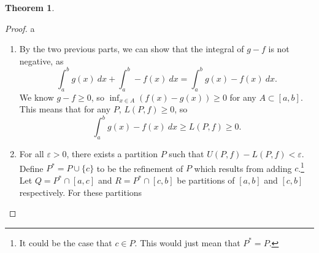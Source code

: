 \documentclass{article}
\def\upint{\mathchoice%
	{\mkern13mu\overline{\vphantom{\intop}\mkern7mu}\mkern-20mu}%
	{\mkern7mu\overline{\vphantom{\intop}\mkern7mu}\mkern-14mu}%
	{\mkern7mu\overline{\vphantom{\intop}\mkern7mu}\mkern-14mu}%
	{\mkern7mu\overline{\vphantom{\intop}\mkern7mu}\mkern-14mu}%
	\int}
\def\lowint{\mkern3mu\underline{\vphantom{\intop}\mkern7mu}\mkern-10mu\int}
\theoremstyle{definition}
\newtheorem{theorem}{Theorem}[section]
\begin{document}
\begin{theorem}
\begin{proof}{\color{white}a}
\begin{enumerate}
\begin{align*}
				\end{align*}
				This gives
				\begin{align*}
					\upint_a^bf(x)\ dx= \inf\limits_{P\in\textbf{P}([a,b])}U(P,cf)=c\inf\limits_{P\in\textbf{P}([a,b])}U(P,f)=c\upint_a^bf(x)\ dx,\\\lowint_a^bf(x)\ dx= \sup\limits_{P\in\textbf{P}([a,b])}L(P,cf)=c\inf\limits_{P\in\textbf{P}([a,b])}L(P,f)=c\lowint_a^bf(x)\ dx.
				\end{align*}
				Since $ f $ is Riemann integrable, its upper and lower Riemann integrals are equal. This establishes the integrability of $ f $, as $$ c\lowint_a^bf(x)\ dx=c\upint_a^bf(x)\ dx=c\int_a^bf(x)\ dx.$$
				
				Now let $ c=-1 $. In this case, we can't ``factor'' out a constant from a supremum and infimum. Instead, for any $ A\subset[a,b] $, we have
				\begin{align*}
					\sup\limits_{x\in A} -f(x)=-\inf\limits_{x\in A} f(x),\\\inf\limits_{x\in A} -f(x)=-\sup\limits_{x\in A} f(x).
				\end{align*}
				We will have $ U(P,-f)=-L(P,f) $ and $ L(P,-f)=-U(P,f) $ for any partition. This gives
				\begin{align*}
					\upint_a^b-f(x)\ dx= \inf\limits_{P\in\textbf{P}([a,b])}U(P,-f)=\inf\limits_{P\in\textbf{P}([a,b])}-L(P,f)=-\sup\limits_{P\in\textbf{P}([a,b])}L(P,f)=-\lowint_a^bf(x)\ dx,\\\lowint_a^b-f(x)\ dx= \sup\limits_{P\in\textbf{P}([a,b])}L(P,-f)=\sup\limits_{P\in\textbf{P}([a,b])}-U(P,f)=-\inf\limits_{P\in\textbf{P}([a,b])}U(P,f)=-\upint_a^bf(x)\ dx. 	 \end{align*}
				Since $ f $ is Riemann integrable, its negative upper and lower Riemann integrals are equal, so $$ \lowint_a^b-f(x)\ dx=c\upint_a^b-f(x)\ dx=c\int_a^b-f(x)\ dx. $$
				In general, if $ c<0 $, we can write it as $ -1\cdot|c| $ and apply the first two cases. 
				\item By the two previous parts, we can show that the integral of $ g-f $ is not negative, as $$ \int_{a}^{b}g(x)\ dx+\int_{a}^{b}-f(x)\ dx=\int_{a}^{b}g(x)-f(x)\ dx.$$ We know $ g-f\ge 0 $, so $ \inf_{x\in A}(f(x)-g(x))\ge 0 $ for any $ A\subset [a,b] $.  This means that for any $ P $, $ L(P,f)\ge 0 $, so $$ \int_{a}^{b}g(x)-f(x)\ dx\ge L(P,f)\ge 0.$$
				\item For all $ \varepsilon>0 $, there exists a partition $ P $ such that $ U(P,f)-L(P,f)<\varepsilon $. Define $ P^*=P\cup\{c\} $ to be the refinement of $ P $ which results from adding $ c $.\footnote{It could be the case that $ c\in P $. This would just mean that $ P^*=P $.} Let $ Q=P^*\cap[a,c] $ and $ R=P^*\cap[c,b] $ be partitions of $ [a,b] $ and $ [c,b] $ respectively. For these partitions 

\end{enumerate}
\end{proof}
\end{theorem}
\end{document}
